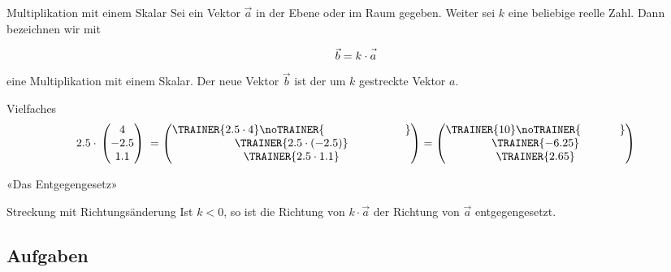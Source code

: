 \begin{definition}{Multiplikation mit einem Skalar}{}
  Sei ein Vektor $\vec{a}$ in der Ebene oder im Raum gegeben. Weiter
  sei $k$ eine beliebige reelle Zahl. Dann bezeichnen wir mit
  
  $$\vec{b} = k \cdot{} \vec{\vphantom{b}a}$$
  eine Multiplikation mit einem Skalar. Der neue Vektor $\vec{b}$ ist
  der um $k$ gestreckte Vektor $a$.
\end{definition}

\begin{beispiel}{Vielfaches}{}
  $$2.5\cdot{} \begin{pmatrix} 4 \\ -2.5 \\ 1.1 \end{pmatrix} \;
  = \begin{pmatrix}\TRAINER{2.5\cdot{} 4}\noTRAINER{\hspace{25mm}}  \\ \TRAINER{2.5\cdot{} (-2.5)} \\ \TRAINER{2.5\cdot{} 1.1} \end{pmatrix}
  = \begin{pmatrix}\TRAINER{10}\noTRAINER{\hspace{12mm}} \\ \TRAINER{-6.25} \\ \TRAINER{2.65} \end{pmatrix}$$
\end{beispiel}

«Das Entgegengesetz»

\begin{bemerkung}{Streckung mit Richtungsänderung}{}
  Ist $k<0$, so ist die Richtung von $k\cdot{}\vec{a}$ der Richtung von $\vec{a}$ entgegengesetzt.
\end{bemerkung}


\subsection*{Aufgaben}

